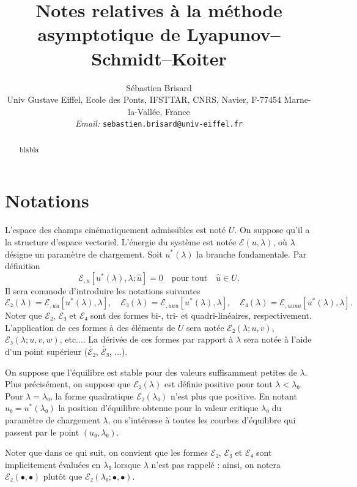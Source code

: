 \documentclass{article}
\newcommand{\tmaffiliation}[1]{\\ #1}
\newcommand{\tmemail}[1]{\\ \textit{Email:} \texttt{#1}}
\begin{document}
\title{Notes relatives à la méthode asymptotique de
Lyapunov--Schmidt--Koiter}

\author{
  Sébastien Brisard
  \tmaffiliation{Univ Gustave Eiffel, Ecole des Ponts, IFSTTAR, CNRS, Navier,
  F-77454 Marne-la-Vallée, France}
  \tmemail{sebastien.brisard@univ-eiffel.fr}
}

\maketitle

\begin{abstract}
  blabla
\end{abstract}

\section{Notations}

L'espace des champs cinématiquement admissibles est noté $U$. On
suppose qu'il a la structure d'espace vectoriel. L'énergie du système
est notée $ℰ (u, λ)$, où $λ$ désigne un
paramètre de chargement. Soit $u^{\ast} (λ)$ la branche
fondamentale. Par définition
\begin{equation}
  ℰ_{, u} [u^{\ast} (λ), λ ; \hat{u}] = 0 \quad
  \text{pour tout} \quad \hat{u}∈U.
\end{equation}
Il sera commode d'introduire les notations suivantes
\begin{equation}
  ℰ₂ (λ) =ℰ_{, u  u}  [u^{\ast} (λ),
  λ], \quad ℰ₃ (λ) =ℰ_{, u  u
   u} [u^{\ast} (λ), λ], \quad ℰ₄ (λ)
  =ℰ_{, u  u  u  u} [u^{\ast} (λ),
  λ] .
\end{equation}
Noter que $ℰ₂$, $ℰ₃$ et $ℰ₄$ sont des formes
bi-, tri- et quadri-linéaires, respectivement. L'application de ces formes
à des éléments de $U$ sera notée $ℰ₂ (λ ; u,
v)$, $ℰ₃ (λ ; u, v, w)$, etc.... La dérivée de ces
formes par rapport à $λ$ sera notée à l'aide d'un point
supérieur ($\dot{ℰ₂}$, $\dot{ℰ₃}$, ...).

On suppose que l'équilibre est stable pour des valeurs suffisamment
petites de $λ$. Plus précisément, on suppose que $ℰ₂
(λ)$ est définie positive pour tout $λ < λ₀$. Pour
$λ = λ₀$, la forme quadratique $ℰ₂ (λ₀)$ n'est
plus que positive. En notant $u₀ = u^{\ast} (λ₀)$ la position
d'équilibre obtenue pour la valeur critique $λ₀$ du paramètre
de chargement $λ$, on s'intéresse à toutes les courbes
d'équilibre qui passent par le point $(u₀, λ₀)$.

Noter que dans ce qui suit, on convient que les formes $ℰ₂$,
$ℰ₃$ et $ℰ₄$ sont implicitement évaluées en
$λ₀$ lorsque $λ$ n'est pas rappelé : ainsi, on notera
$ℰ₂ (•, •)$ plutôt que $ℰ₂ (λ₀ ;
•, •)$.
\end{document}

